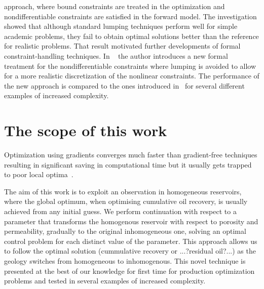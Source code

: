 approach, where bound constraints are treated in the optimization and nondifferentiable 
constraints are satisfied in the forward model. The investigation showed that 
although standard lumping techniques perform well for simple academic problems, they fail 
to obtain optimal solutions better than the reference for realistic problems.
That result motivated further developments of formal constraint-handling 
techniques. In ~\citep{Kourounis2015} the author introduces a new formal treatment for the 
nondifferentiable  constraints where lumping is avoided to allow for a more realistic 
discretization of the nonlinear constraints. The performance of the new approach is compared to
the ones introduced in~\citep{Kourounis2014} for several different examples
of increased complexity. 

\section{The scope of this work}
Optimization using gradients converges much faster than gradient-free techniques 
resulting in significant saving in computational time but it usually gets 
trapped to poor local optima~\citep{Kourounis2014,Kourounis2015}. 

The aim of this work is to exploit an observation in homogeneous reservoirs, 
where the global optimum, when optimising cumulative oil recovery,  is usually 
achieved from any initial guess. We perform continuation with 
respect to a parameter that transforms the homogenous reservoir with respect to 
porosity and permeability, gradually to the original inhomogeneous one, solving an optimal 
control 
problem for each distinct value of the parameter. This approach allows us to follow the optimal solution
(cummulative recovery or ...?residual oil?...) as the geology switches from homogeneous to inhomogenous.
This novel technique is presented at the best of our knowledge for first time for 
production optimization problems and tested in several examples of increased complexity.



 







\endinput
